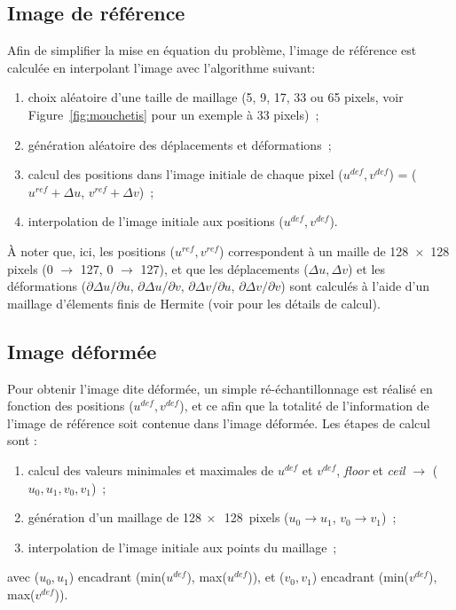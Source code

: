 \documentclass[
	a4paper, %
	10pt, %
	twoside, %
	french
]{LTJournalArticle}
\newcommand\fref[1]{Figure~\ref{#1}}
\begin{document}
\subsection{Image de référence}
Afin de simplifier la mise en équation du problème, l'image de référence est calculée en interpolant l'image avec l'algorithme suivant:
\begin{enumerate}
	\item choix aléatoire d'une taille de maillage (5, 9, 17, 33 ou 65 pixels, voir \fref{fig:mouchetis} pour un exemple à 33 pixels)~;
	\item génération aléatoire des déplacements et déformations~;
	\item calcul des positions dans l'image initiale de chaque pixel ($u^{def}, v^{def}$) = ($u^{ref}+\Delta u$, $v^{ref}+\Delta v$)~;
	\item interpolation de l'image initiale aux positions ($u^{def}, v^{def}$).
\end{enumerate}
À noter que, ici, les positions ($u^{ref}, v^{ref}$) correspondent à un maille de 128~$\times$~128 pixels (0 $\rightarrow$ 127, 0 $\rightarrow$ 127), et que les déplacements ($\Delta u, \Delta v$) et les déformations ($\partial \Delta u / \partial u$, $\partial \Delta u / \partial v$, $\partial \Delta v / \partial u$, $\partial \Delta v / \partial v$) sont calculés à l'aide d'un maillage d'élements finis de Hermite (voir \cite{WANG:2023107278} pour les détails de calcul).


\subsection{Image déformée}
Pour obtenir l'image dite déformée, un simple ré-échantillonnage est réalisé en fonction des positions ($u^{def}, v^{def}$), et ce afin que la totalité de l'information de l'image de référence soit contenue dans l'image déformée.
Les étapes de calcul sont :
\begin{enumerate}
	\item calcul des valeurs minimales et maximales de $u^{def}$ et $v^{def}$, \textit{floor} et \textit{ceil} $\rightarrow$ ($u_0, u_1, v_0, v_1$)~;
	\item génération d'un maillage de 128$~\times$~128~pixels ($u_0 \rightarrow u_1$, $v_0 \rightarrow v_1$)~;
	\item interpolation de l'image initiale aux points du maillage~;
\end{enumerate}
avec ($u_0, u_1$) encadrant (min($u^{def}$), max($u^{def}$)), et ($v_0, v_1$) encadrant (min($v^{def}$), max($v^{def}$)).
\end{document}
